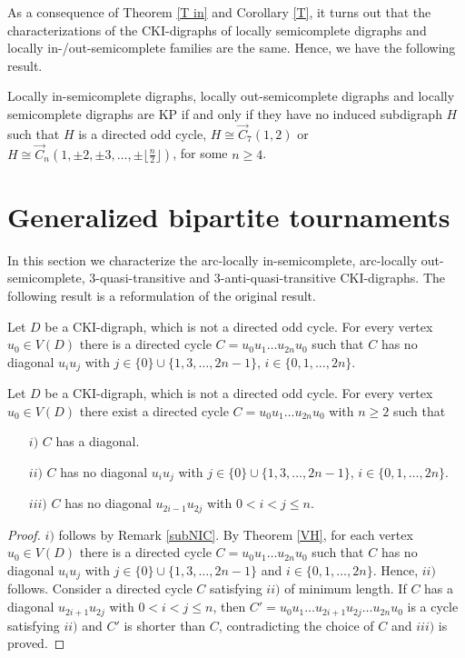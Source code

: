 As a consequence of  Theorem \ref{T in} and Corollary  \ref{T}, it turns out that the characterizations of the CKI-digraphs of locally semicomplete digraphs and locally in-/out-semicomplete families are the same. Hence, we have the following result.
\begin{teo}\label{T in/out KP}
Locally in-semicomplete digraphs, locally out-semicomplete digraphs and locally semicomplete digraphs are KP if and only if they have no induced subdigraph $H$ such that $H$ is a directed odd cycle, $H\cong \overrightarrow{C}_7(1,2)$ or $H\cong \overrightarrow{C}_n(1,\pm2,\pm3,\dots,\pm\lfloor \frac{n}{2}\rfloor)$, for some $n\ge4$.
\end{teo}


\section{Generalized bipartite tournaments}

In this section we characterize the arc-locally in-semicomplete, arc-locally out-semicomplete, $3$-quasi-transitive and $3$-anti-quasi-transitive  CKI-digraphs. 
%
The following result is a reformulation of the original result.
\begin{teo}\label{VH} Let $D$ be a CKI-digraph, which is not a directed odd cycle. For every vertex $u_0\in V(D)$ there is a directed cycle $C=u_0u_1\dots u_{2n}u_0$ such that $C$ has no diagonal $u_i u_j$ with $j\in\{0\}\cup \{1,3,\dots,2n-1\}$, $i\in \{0,1,\dots,2n\}$.
\end{teo}

\begin{teo}\label{VH min} Let $D$ be a CKI-digraph, which is not a directed odd cycle. For every vertex ${u_0\in V(D)}$ there exist a directed cycle $C=u_0u_1\dots u_{2n}u_0$ with $n\ge2$ such that
\begin{enumerate}
\item[$i)$] $C$ has a diagonal.
\item[$ii)$] $C$ has no diagonal $u_i u_j$ with $j\in\{0\}\cup \{1,3,\dots,2n-1\}$, $i\in \{0,1,\dots,2n\}$.
\item[$iii)$] $C$ has no diagonal $u_{2i-1}u_{2j}$ with $0<i<j\le n$. \label{subciclo}
\end{enumerate}
\end{teo}

\begin{proof}
$i)$ follows by Remark \ref{subNIC}. By Theorem \ref{VH}, for each vertex $u_0\in V(D)$ there is a directed cycle $C=u_0u_1\dots u_{2n}u_0$ such that $C$ has no diagonal $u_i u_j$ with $j\in\{0\}\cup \{1,3,\dots,2n-1\}$ and $i\in \{0,1,\dots,2n\}$. Hence, $ii)$ follows. Consider a directed cycle $C$ satisfying $ii)$ of minimum length.
If $C$ has a diagonal $u_{2i+1}u_{2j}$ with $0<i<j\le n$, then $C'=u_0u_1\dots u_{2i+1}u_{2j}\dots u_{2n}u_0$ is a cycle satisfying $ii)$ and $C'$ is shorter than $C$, contradicting the choice of $C$ and $iii)$ is proved. 
\end{proof}



